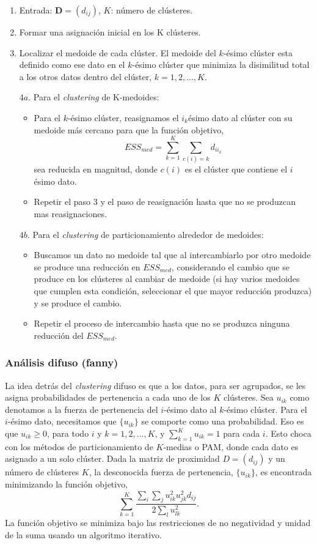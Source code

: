 \documentclass[a4paper, 20pt]{article}
\begin{document}
\begin{enumerate}
\item Entrada: $\textbf{D}=(d_{ij})$, $K$: número de clústeres.
\item Formar una asignación inicial en los K clústeres.
\item Localizar el medoide de cada clúster. El medoide del $k$-ésimo clúster esta definido como ese dato en el $k$-ésimo clúster que minimiza la disimilitud total a los otros datos dentro del clúster, $k=1,2,...,K$.


\item[$4a.$] Para el \textit{clustering} de K-medoides:
\begin{itemize}
\item Para el $k$-ésimo clúster, reasignamos el $i_k$ésimo dato al clúster con su medoide más cercano para que la función objetivo, $$ESS_{med}=\sum_{k=1}^{K}\sum_{c(i)=k}d_{ii_k}$$
sea reducida en magnitud, donde $c(i)$ es el clúster que contiene el $i$ésimo dato.
\item Repetir el paso 3 y el paso de reasignación hasta que no se produzcan mas reasignaciones.
\end{itemize}
\item[$4b.$] Para  el \textit{clustering} de particionamiento alrededor de medoides:

\begin{itemize}
\item Buscamos un dato no medoide tal que al intercambiarlo por otro medoide se produce una reducción en $ESS_{med}$, considerando el cambio que se produce en los clústeres al cambiar de medoide (si hay varios medoides que cumplen esta condición, seleccionar el que mayor reducción produzca) y se produce el cambio.

\item Repetir el proceso de intercambio hasta que no se produzca ninguna reducción del $ESS_{med}$.
\end{itemize}
\end{enumerate}

\subsubsection{Análisis difuso (fanny)}

La idea detrás del \textit{clustering} difuso es que a los datos, para ser agrupados, se les asigna probabilidades de pertenencia a cada uno de los $K$ clústeres. Sea $u_{ik}$ como denotamos a la fuerza de pertenencia del $i$-ésimo dato al $k$-ésimo clúster. Para el $i$-ésimo dato, necesitamos que $\{u_{ik}\}$ se comporte como una probabilidad. Eso es que $u_{ik}\geq0$, para todo $i$ y $k=1,2,...,K$, y $\sum_{k=1}^{K}u_{ik}=1$ para cada $i$. Esto choca con los métodos de particionamiento de $K$-medias o PAM, donde cada dato es asignado a un solo clúster.
Dada la matriz de proximidad $D=(d_{ij})$ y un número de clústeres $K$, la desconocida fuerza de pertenencia, $\{u_{ik}\}$, es encontrada minimizando la función objetivo, $$\sum_{k=1}^{K}\frac{\sum_i\sum_ju_{ik}^2u_{jk}^2d_{ij}}{2\sum_lu_{lk}^2}.$$ La función objetivo se minimiza bajo las restricciones de no negatividad y unidad de la suma usando un algoritmo iterativo.
\end{document}
